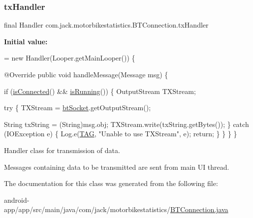\subsubsection{\texorpdfstring{tx\+Handler}{txHandler}}
{\footnotesize\ttfamily final Handler com.\+jack.\+motorbikestatistics.\+B\+T\+Connection.\+tx\+Handler}

{\bfseries Initial value\+:}
\begin{DoxyCode}
= \textcolor{keyword}{new} Handler(Looper.getMainLooper()) \{

        
        @Override
        \textcolor{keyword}{public} \textcolor{keywordtype}{void} handleMessage(Message msg) \{

            
            \textcolor{keywordflow}{if} (\hyperlink{classcom_1_1jack_1_1motorbikestatistics_1_1_b_t_connection_a22f33e46d9f460d78865d4c63b645357}{isConnected}() && \hyperlink{classcom_1_1jack_1_1motorbikestatistics_1_1_b_t_connection_a17b07494b0e7cba2e550054d7b47e309}{isRunning}()) \{
                OutputStream TXStream;

                
                \textcolor{keywordflow}{try} \{
                    TXStream = \hyperlink{classcom_1_1jack_1_1motorbikestatistics_1_1_b_t_connection_a0d47f94a35f7c8a07429975446e7b33b}{btSocket}.getOutputStream();

                    String txString = (String)msg.obj;
                    TXStream.write(txString.getBytes());
                \} \textcolor{keywordflow}{catch} (IOException e) \{
                    Log.e(\hyperlink{classcom_1_1jack_1_1motorbikestatistics_1_1_b_t_connection_af9455991fec4de29ffc875eae117a761}{TAG}, \textcolor{stringliteral}{"Unable to use TXStream"}, e);
                    \textcolor{keywordflow}{return};
                \}
            \}
        \}
    \}
\end{DoxyCode}


Handler class for transmission of data. 

Messages containing data to be transmitted are sent from main UI thread. 

The documentation for this class was generated from the following file\+:\begin{DoxyCompactItemize}
\item 
android-\/app/app/src/main/java/com/jack/motorbikestatistics/\hyperlink{_b_t_connection_8java}{B\+T\+Connection.\+java}\end{DoxyCompactItemize}
